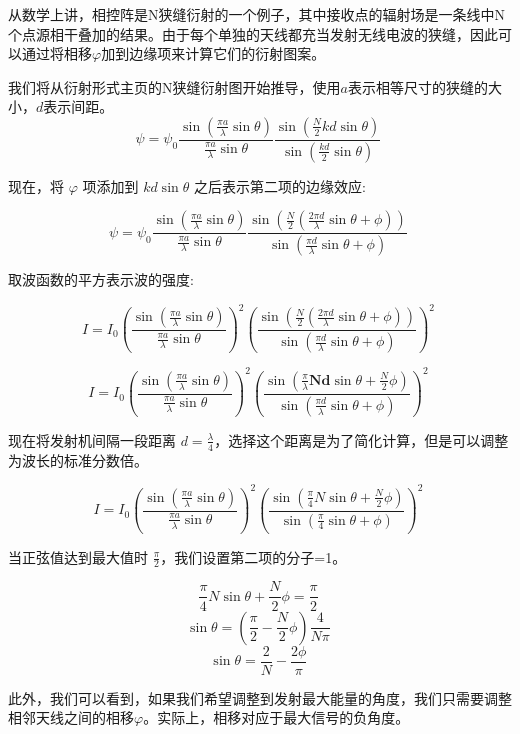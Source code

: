 从数学上讲，相控阵是N狭缝衍射的一个例子，其中接收点的辐射场是一条线中N个点源相干叠加的结果。由于每个单独的天线都充当发射无线电波的狭缝，因此可以通过将相移$\varphi$加到边缘项来计算它们的衍射图案。

我们将从衍射形式主页的N狭缝衍射图开始推导，使用$a$表示相等尺寸的狭缝的大小，$d$表示间距。
$$\psi = \psi_0 \frac{\sin\left( \frac{\pi a}{\lambda} \sin \theta \right)}{\frac{\pi a}{\lambda} \sin \theta} \frac{\sin\left( \frac{N}{2} kd \sin \theta \right)}{\sin \left( \frac{kd}{2} \sin \theta \right)}~$$

现在，将 $\varphi$ 项添加到 $kd \sin \theta$ 之后表示第二项的边缘效应:

$$\psi = \psi_0 \frac{\sin\left( \frac{\pi a}{\lambda} \sin \theta \right)}{\frac{\pi a}{\lambda} \sin \theta} \frac{\sin\left( \frac{N}{2} \left(  \frac{2\pi d}{\lambda} \sin \theta + \phi \right) \right)}{\sin \left( \frac{\pi d}{\lambda} \sin \theta + \phi \right)}~$$

取波函数的平方表示波的强度:

$$I = I_0 \left( \frac{\sin\left( \frac{\pi a}{\lambda} \sin \theta \right)}{\frac{\pi a}{\lambda} \sin \theta} \right)^2 \left( \frac{\sin\left( \frac{N}{2} \left( \frac{2\pi d}{\lambda} \sin \theta + \phi \right) \right)}{\sin \left( \frac{\pi d}{\lambda} \sin \theta + \phi \right)} \right)^2~$$

$$I = I_0 \left( \frac{\sin\left( \frac{\pi a}{\lambda} \sin \theta \right)}{\frac{\pi a}{\lambda} \sin \theta} \right)^2 \left( \frac{\sin\left( \frac{\pi}{\lambda}\mathbf{Nd}\sin \theta + \frac{N}{2} \phi \right)}{\sin \left( \frac{\pi d}{\lambda} \sin \theta + \phi \right)} \right)^2~$$

现在将发射机间隔一段距离 $d = \frac{\lambda}{4}$，选择这个距离是为了简化计算，但是可以调整为波长的标准分数倍。

$$I = I_0 \left( \frac{\sin \left( \frac{\pi a}{\lambda} \sin \theta \right)}{\frac{\pi a}{\lambda} \sin \theta} \right)^2 \left( \frac{\sin \left( \frac{\pi}{4} N \sin \theta + \frac{N}{2} \phi \right)}{\sin \left( \frac{\pi}{4} \sin \theta + \phi \right)} \right)^2~$$

当正弦值达到最大值时 $\frac{\pi}{2}$，我们设置第二项的分子=1。

$$\frac{\pi}{4} N \sin \theta + \frac{N}{2} \phi = \frac{\pi}{2}~$$
$$\sin \theta = \left( \frac{\pi}{2} - \frac{N}{2} \phi \right) \frac{4}{N \pi}~$$
$$\sin \theta = \frac{2}{N} - \frac{2 \phi}{\pi}~$$

此外，我们可以看到，如果我们希望调整到发射最大能量的角度，我们只需要调整相邻天线之间的相移$\varphi$。实际上，相移对应于最大信号的负角度。

